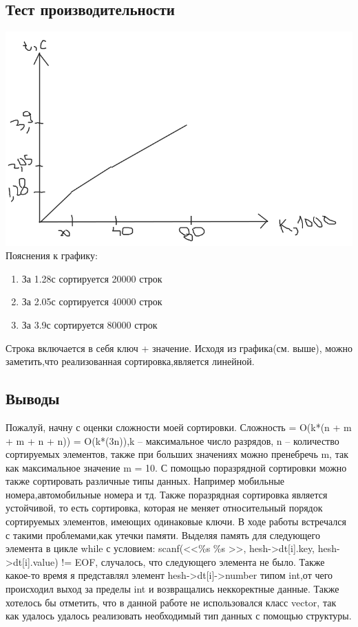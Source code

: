 \documentclass[12pt]{article}
\begin{document}
\subsection*{Тест производительности}
\includegraphics[scale = 0.4]{gg.png}\newline
Пояснения к графику:
\begin{enumerate}
\item За 1.28с сортируется 20000 строк
\item За 2.05с сортируется 40000 строк
\item За 3.9с сортируется 80000 строк
\end{enumerate}
Строка включается в себя ключ + значение. Исходя из графика(см. выше), можно заметить,что реализованная сортировка,является линейной.

\subsection*{Выводы}
Пожалуй, начну с оценки сложности моей сортировки. Сложность = O(k*(n + m + m + n + n)) = O(k*(3n)),k -- максимальное число разрядов, n -- количество сортируемых элементов, также при больших значениях можно пренебречь m, так как максимальное значение m = 10. С помощью поразрядной сортировки можно также сортировать различные типы данных. Например мобильные номера,автомобильные номера и тд. Также поразрядная сортировка является устойчивой, то есть сортировка, которая не меняет относительный порядок сортируемых элементов, имеющих одинаковые ключи. В ходе работы встречался с такими проблемами,как утечки памяти. Выделяя память для следующего элемента в цикле while с условием: scanf(<<\%s \%s >>, hesh->dt[i].key, hesh->dt[i].value) != EOF, случалось, что следующего элемента не было. Также какое-то время я представлял элемент hesh->dt[i]->number типом int,от чего происходил выход за пределы int и возвращались неккоректные данные. Также хотелось бы отметить, что в данной работе не использовался класс vector, так как удалось удалось реализовать необходимый тип данных с помощью структуры.
\end{document}
